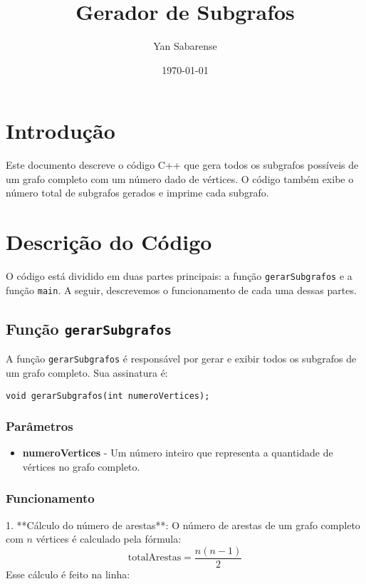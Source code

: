 \documentclass{article}
\title{Gerador de Subgrafos}
\author{Yan Sabarense}
\date{\today}
\begin{document}
\maketitle

\section{Introdução}

Este documento descreve o código C++ que gera todos os subgrafos possíveis de um grafo completo com um número dado de vértices. O código também exibe o número total de subgrafos gerados e imprime cada subgrafo.

\section{Descrição do Código}

O código está dividido em duas partes principais: a função \texttt{gerarSubgrafos} e a função \texttt{main}. A seguir, descrevemos o funcionamento de cada uma dessas partes.

\subsection{Função \texttt{gerarSubgrafos}}

A função \texttt{gerarSubgrafos} é responsável por gerar e exibir todos os subgrafos de um grafo completo. Sua assinatura é:

\begin{lstlisting}
void gerarSubgrafos(int numeroVertices);
\end{lstlisting}

\subsubsection*{Parâmetros}

\begin{itemize}
    \item \textbf{numeroVertices} - Um número inteiro que representa a quantidade de vértices no grafo completo.
\end{itemize}

\subsubsection*{Funcionamento}

1. **Cálculo do número de arestas**: O número de arestas de um grafo completo com \( n \) vértices é calculado pela fórmula:
   \[
   \text{totalArestas} = \frac{n(n-1)}{2}
   \]
   Esse cálculo é feito na linha:
\end{document}
